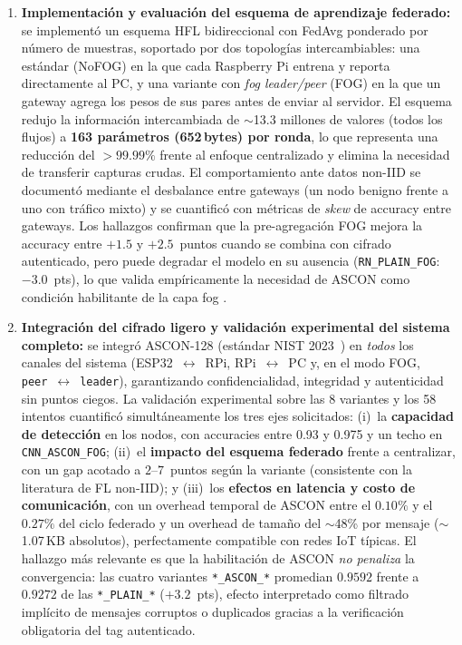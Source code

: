 \begin{enumerate}
    \item \textbf{Implementación y evaluación del esquema de aprendizaje federado:} se implementó un esquema HFL bidireccional con FedAvg ponderado por número de muestras, soportado por dos topologías intercambiables: una estándar (NoFOG) en la que cada Raspberry Pi entrena y reporta directamente al PC, y una variante con \emph{fog leader/peer} (FOG) en la que un gateway agrega los pesos de sus pares antes de enviar al servidor. El esquema redujo la información intercambiada de $\sim$13.3 millones de valores (todos los flujos) a \textbf{163 parámetros (652\,bytes) por ronda}, lo que representa una reducción del $>99.99\%$ frente al enfoque centralizado y elimina la necesidad de transferir capturas crudas. El comportamiento ante datos non-IID se documentó mediante el desbalance entre gateways (un nodo benigno frente a uno con tráfico mixto) y se cuantificó con métricas de \emph{skew} de accuracy entre gateways. Los hallazgos confirman que la pre-agregación FOG mejora la accuracy entre $+1.5$ y $+2.5$~puntos cuando se combina con cifrado autenticado, pero puede degradar el modelo en su ausencia (\texttt{RN\_PLAIN\_FOG}: $-3.0$~pts), lo que valida empíricamente la necesidad de ASCON como condición habilitante de la capa fog \cite{Imteaj2022_FL_ResourceConstrainedSurvey, Albanbay2025}.

    \item \textbf{Integración del cifrado ligero y validación experimental del sistema completo:} se integró ASCON-128 (estándar NIST 2023~\cite{Kaur2025_ASCON_Survey}) en \emph{todos} los canales del sistema (ESP32~$\leftrightarrow$~RPi, RPi~$\leftrightarrow$~PC y, en el modo FOG, \texttt{peer}~$\leftrightarrow$~\texttt{leader}), garantizando confidencialidad, integridad y autenticidad sin puntos ciegos. La validación experimental sobre las 8 variantes y los 58 intentos cuantificó simultáneamente los tres ejes solicitados: (i)~la \textbf{capacidad de detección} en los nodos, con accuracies entre 0.93 y 0.975 y un techo en \texttt{CNN\_ASCON\_FOG}; (ii)~el \textbf{impacto del esquema federado} frente a centralizar, con un gap acotado a $2$--$7$~puntos según la variante (consistente con la literatura de FL non-IID); y (iii)~los \textbf{efectos en latencia y costo de comunicación}, con un overhead temporal de ASCON entre el $0.10\%$ y el $0.27\%$ del ciclo federado y un overhead de tamaño del $\sim$48\% por mensaje ($\sim$1.07\,KB absolutos), perfectamente compatible con redes IoT típicas. El hallazgo más relevante es que la habilitación de ASCON \emph{no penaliza} la convergencia: las cuatro variantes \texttt{*\_ASCON\_*} promedian $0.9592$ frente a $0.9272$ de las \texttt{*\_PLAIN\_*} ($+3.2$~pts), efecto interpretado como filtrado implícito de mensajes corruptos o duplicados gracias a la verificación obligatoria del tag autenticado.
\end{enumerate}

